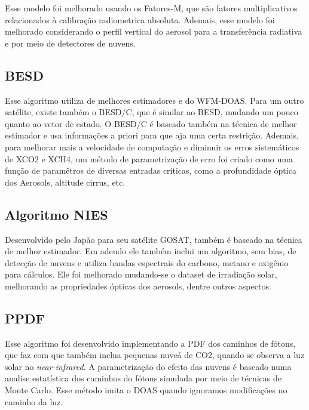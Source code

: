 \documentclass{article}[12pt]
\begin{document}
Esse modelo foi melhorado usando os Fatores-M, que são fatores multiplicativos relacionados à
calibração radiometrica absoluta. Ademais, esse modelo foi melhorado considerando o perfil vertical
do aerosol para a transferência radiativa e por meio de detectores de nuvens. \par

\subsection{BESD} 

Esse algoritmo utiliza de melhores estimadores e do WFM-DOAS. Para um outro satélite, existe também
o BESD/C, que é similar ao BESD, mudando um pouco quanto ao vetor de estado. O BESD/C é baseado
também na técnica de melhor estimador e usa informações a priori para que aja uma certa restrição.
Ademais, para melhorar mais a velocidade de computação e diminuir os erros sistemáticos de XCO2 e
XCH4, um método de parametrização de erro foi criado como uma função de paramêtros de diversas
entradas críticas, como a profundidade óptica dos Aerosols, altitude cirrus, etc. \par

\subsection{Algoritmo NIES} 

Desenvolvido pelo Japão para seu satélite GOSAT, também é baseado na técnica de melhor estimador. Em
adendo ele também inclui um algoritmo, sem bias, de detecção de nuvens e utiliza bandas espectrais
do carbono, metano e oxigênio para cálculos. Ele foi melhorado mudando-se o dataset de irradiação
solar, melhorando as propriedades ópticas dos aerosols, dentre outros aspectos. \par

\subsection{PPDF}

Esse algoritmo foi desenvolvido implementando a PDF dos caminhos de fótons, que faz com que também
inclua pequenas nuveá de CO2, quando se observa a luz solar no \textit{near-infrared}. A
parametrização do efeito das nuvens é baseado numa analise estatística dos caminhos do fótons
simulada por meio de técnicas de Monte Carlo. Esse método imita o DOAS quando ignoramos modificações
no caminho da luz. \par
\end{document}

